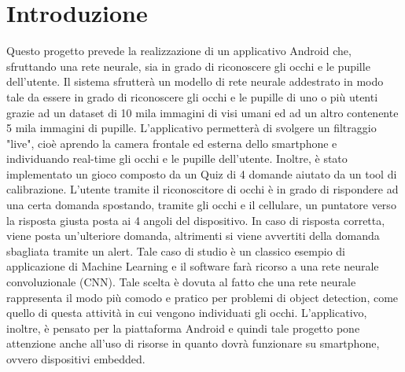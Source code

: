 \documentclass[11pt]{article}
\begin{document}
\clearpage
\null
\thispagestyle{empty}
\clearpage

\newpage







\cleardoublepage



\newpage

\tableofcontents


\newpage


\listoffigures



\newpage


\newpage
\fancyfoot[L]{\thepage}
\setcounter{page}{1}
\section{Introduzione}
Questo progetto prevede la realizzazione di un applicativo Android che, sfruttando una rete neurale, sia in grado di riconoscere gli occhi e le pupille dell'utente. Il sistema sfrutterà un modello di rete neurale
addestrato in modo tale da essere in grado di riconoscere gli occhi e le pupille di uno o più utenti grazie ad un dataset di 10 mila immagini di visi umani ed ad un altro contenente 5 mila immagini di pupille.
L’applicativo permetterà di svolgere un filtraggio "live", cioè aprendo la camera frontale ed esterna dello smartphone e individuando real-time gli occhi e le pupille dell’utente.
\newline
Inoltre, è stato implementato un gioco composto da un Quiz di 4 domande aiutato da un tool di calibrazione. L'utente tramite il riconoscitore di occhi è in grado di rispondere ad una certa domanda spostando, tramite gli occhi e il cellulare, un puntatore verso la risposta giusta posta ai 4 angoli del dispositivo. In caso di risposta corretta, viene posta un'ulteriore domanda, altrimenti si viene avvertiti della domanda sbagliata tramite un alert.
\newline \newline
Tale caso di studio è un classico esempio di applicazione di Machine Learning e il software farà ricorso a una rete neurale convoluzionale (CNN). Tale scelta è dovuta al fatto che una rete neurale rappresenta il modo più comodo e pratico per problemi di object detection, come quello di questa attività in cui vengono individuati gli occhi.
\newline \newline
L’applicativo, inoltre, è pensato per la piattaforma Android e quindi tale progetto pone attenzione anche all’uso di risorse in quanto dovrà funzionare su smartphone, ovvero dispositivi embedded.
\end{document}
